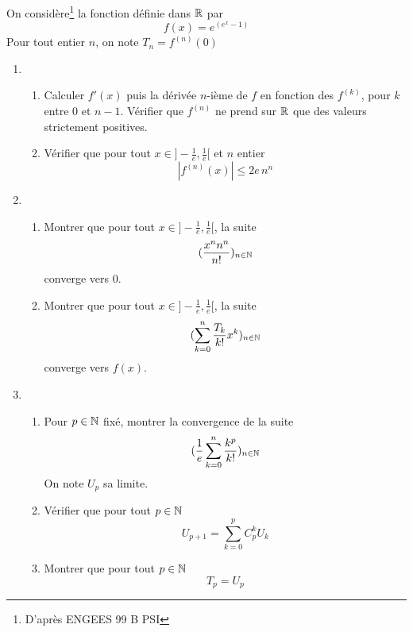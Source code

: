 On considère\footnote{ D'après ENGEES 99 B PSI} la fonction définie dans $\Bbb{R}$ par
$$f(x)=e^{(e^{x}-1)}$$
Pour tout entier $n$, on note $T_{n}=f^{(n)}(0)$
\begin{enumerate}
\item \begin{enumerate}
	\item Calculer $f'(x)$ puis la dérivée $n$-ième de $f$ en fonction des $f^{(k)}$, pour $k$ entre 0 et $n-1$. Vérifier que $f^{(n)}$ ne prend sur $\Bbb{R}$ que des valeurs strictement positives.
	\item Vérifier que pour tout $x \in ]-\frac{1}{e},\frac{1}{e}[$ et $n$ entier
$$|f^{(n)}(x)|\leq 2e\,n^{n}$$
	\end{enumerate}
\item\begin{enumerate}
\item Montrer que pour tout $x \in ]-\frac{1}{e},\frac{1}{e}[$, la suite $$(\frac{x^{n}n^{n}}{n!})_{n\in \Bbb{N}}$$
converge vers 0.
\item Montrer que pour tout $x \in ]-\frac{1}{e},\frac{1}{e}[$, la suite $$(\sum_{k=0}^{n}\frac{T_{k} }{k!} x^{k})_{n\in \Bbb{N}}$$
converge vers $f(x)$.
	\end{enumerate}
\item\begin{enumerate}
	\item Pour $p \in \Bbb{N}$ fixé, montrer la convergence de la suite
$$(\frac{1}{e}\sum_{k=0}^{n}\frac{k^{p}}{k !})_{n\in \Bbb{N}}$$
On note $U_{p}$ sa limite.
	\item Vérifier que pour tout $p \in \Bbb{N}$
$$U_{p+1}=\sum_{k=0}^{p}C_{p}^{k}U_{k}$$
	\item Montrer que pour tout $p \in \Bbb{N}$
$$T_{p}=U_{p}$$
	\end{enumerate}

\end{enumerate}

